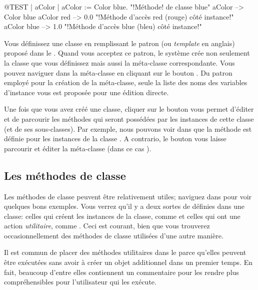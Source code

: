 \documentclass[a4paper,10pt,twoside]{book}
\begin{document}
\begin{code}{@TEST | aColor |}
aColor := Color blue.               "!Méthode! de classe blue"
aColor        --> Color blue
aColor red  --> 0.0         "!Méthode d'accès red (rouge) côté instance!"
aColor blue --> 1.0        "!Méthode d'accès blue (bleu) côté instance!"
\end{code}

Vous définissez une classe en remplissant le patron (ou \emph{template} en anglais) proposé
dans le .
Quand vous acceptez ce patron, le système crée non seulement la classe
que vous définissez mais aussi la méta-classe correspondante.
Vous pouvez naviguer dans la méta-classe en cliquant sur le bouton .
Du patron employé pour la création de la méta-classe, seule la
liste des noms des variables d'instance vous est proposée pour une édition directe.  

Une fois que vous avez créé une classe, cliquer sur
le bouton  vous permet d'éditer et de parcourir les
méthodes qui seront possédées par les instances de cette classe (et de ses sous-classes). Par exemple, nous pouvons voir dans  que 
la méthode  est définie pour les instances de la classe .
A contrario, le bouton  vous laisse parcourir et éditer
la méta-classe (dans ce cas ).

\subsection{Les méthodes de classe} 

Les méthodes de classe peuvent être relativement utiles; naviguez dans  pour voir quelques bons exemples.
Vous verrez qu'il y a deux sortes de  définies dans une classe: celles qui créent les instances de la classe, comme  et celles qui ont une action \emph{utilitaire}, 
comme .
Ceci est courant, bien que vous trouverez occasionnellement des méthodes de classe utilisées d'une autre manière.

Il est commun de placer des méthodes utilitaires dans le  parce qu'elles peuvent être exécutées
sans avoir à créer un objet additionnel dans un premier temps. 
En fait, beaucoup d'entre elles contiennent un commentaire pour les rendre plus compréhensibles pour l'utilisateur qui les exécute.
\end{document}
